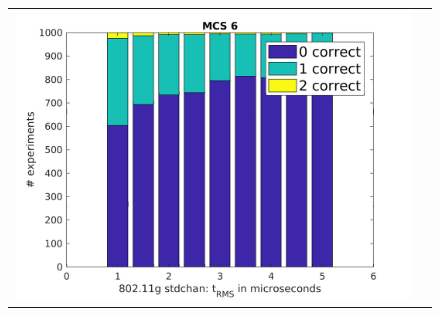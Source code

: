 \documentclass[accentcolor=tud8b,colorbacktitle]{tudbeamer}
\begin{document}
\begin{frame}
\begin{figure}[H]
\begin{tabular}{cc}
		\includegraphics[height=0.52\textheight]{../../gfx/plots/trms-mcs6} \\
	\end{tabular}
\end{figure}
\end{frame}
\end{document}
